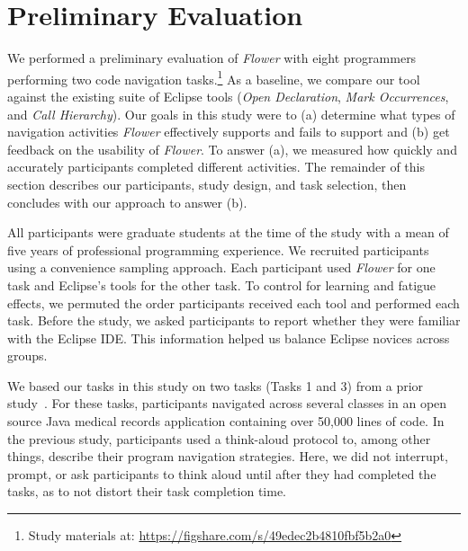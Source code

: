 \documentclass[conference]{IEEEtran}
\begin{document}


\section{Preliminary Evaluation}
We performed a preliminary evaluation of \textit{Flower} with eight programmers performing two code navigation tasks.\footnote{Study materials at: 
	\url{https://figshare.com/s/49edec2b4810fbf5b2a0}}
As a baseline, we compare our tool against the existing suite of Eclipse tools (\emph{Open Declaration}, \emph{Mark Occurrences}, and \emph{Call Hierarchy}).
Our goals in this study were to (a) determine what types of navigation activities \textit{Flower} effectively supports and fails to support and (b) get feedback on the usability of \textit{Flower}.
To answer (a), we measured how quickly and accurately participants completed different activities.
The remainder of this section describes our participants, study design, and task selection, then concludes with our approach to answer (b).

All participants were graduate students at the time of the study with a mean of five years of professional programming experience. 
We recruited participants using a convenience sampling approach. 
Each participant used \textit{Flower} for one task and Eclipse's tools for the other task.
To control for learning and fatigue effects, we permuted the order participants received each tool and performed each task. 
Before the study, we asked participants to report whether they were familiar with the Eclipse IDE. This information helped us balance Eclipse novices across groups.

We based our tasks in this study on two tasks (Tasks 1 and 3) from a prior study~\cite{Smith2015}.
For these tasks, participants navigated across several classes in an open source Java medical records application containing over 50,000 lines of code.
In the previous study, participants used a think-aloud protocol to, among other things, describe their program navigation strategies.
Here, we did not interrupt, prompt, or ask participants to think aloud until after they had completed the tasks, as to not distort their task completion time.
\end{document}
